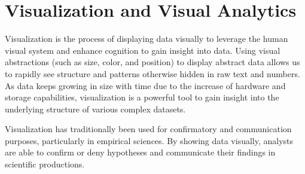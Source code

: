 

\section{Visualization and Visual Analytics}

Visualization is the process of displaying data visually to leverage the human visual system and enhance cognition to gain insight into data\cite{cardReadingsInformationVisualization1999}.
Using visual abstractions (such as size, color, and position) to display abstract data allows us to rapidly see structure and patterns otherwise hidden in raw text and numbers.
As data keeps growing in size with time due to the increase of hardware and storage capabilities, visualization is a powerful tool to gain insight into the underlying structure of various complex datasets.

Visualization has traditionally been used for confirmatory and communication purposes, particularly in empirical sciences\cite{shneidermanInventingDiscoveryTools2002}.
By showing data visually, analysts are able to confirm or deny hypotheses and communicate their findings in scientific productions.


